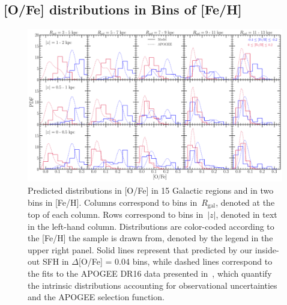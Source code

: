 \documentclass[draft2.tex]{subfiles}
\begin{document}
\subsection{[O/Fe] distributions in Bins of [Fe/H]} 
\label{sec:obs_comp:ofe_dists} 

\begin{figure} 
\centering 
\includegraphics[scale = 0.32]{ofe_mdfs.pdf} 
\caption{Predicted distributions in [O/Fe] in 15 Galactic regions and in two 
bins in [Fe/H]. Columns correspond to bins in~$R_\text{gal}$, denoted at the 
top of each column. Rows correspond to bins in~$\left|z\right|$, denoted in 
text in the left-hand column. Distributions are color-coded according to the 
[Fe/H] the sample is drawn from, denoted by the legend in the upper right 
panel. Solid lines represent that predicted by our inside-out SFH in 
$\Delta$[O/Fe] = 0.04 bins, while dashed lines correspond to the fits to the 
APOGEE DR16 data presented in~\citet{Vincenzo2021a}, which quantify the 
intrinsic distributions accounting for observational uncertainties and the 
APOGEE selection function. } 
\label{fig:ofe_mdfs_insideout} 
\end{figure} 
\end{document}
